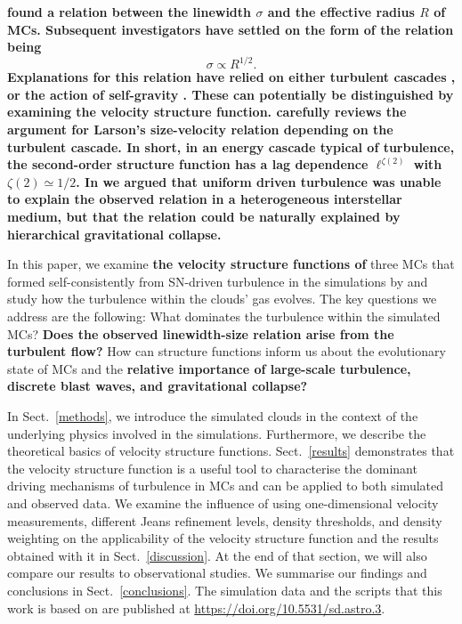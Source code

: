 \textbf{
\citet{Larson1981} found a relation between the linewidth $\sigma$ and the effective radius $R$ of MCs.
Subsequent investigators have settled on the form of the relation being \citep{Solomon1987,Falgarone2009,Heyer2009}
}
\begin{equation} \label{eq:larson}
    \sigma \propto R^{1/2}.
\end{equation}
\textbf{Explanations for this relation have relied on either turbulent cascades \citep{Larson1981,Kritsuk2013,Kritsuk2015,Gnedin2015,Padoan2016}, or the action of self-gravity \citep{Elmegreen1993,Vazquez2006,Elmegreen2007,Heyer2009,Ballesteros2011}.  These can potentially be distinguished by examining the velocity structure function.
\citet{Kritsuk2013} carefully reviews the argument for Larson's size-velocity relation depending on the turbulent cascade. In short, in an energy cascade typical of turbulence, the second-order structure function has a lag dependence $\ell^{\zeta(2)}$  with $\zeta(2) \simeq 1/2$. In \citet[hereafter ]{IbanezMejia2016} we argued that uniform driven turbulence was unable to explain the observed relation in a heterogeneous interstellar medium, but that the relation could be naturally explained by hierarchical gravitational collapse.}

In this paper, we examine \textbf{the velocity structure functions of} three MCs that formed self-consistently from SN-driven turbulence in the simulations by \citet[hereafter  and ]{IbanezMejia2016,IbanezMejia2017} and study how the turbulence within the clouds' gas evolves.
The key questions we address are the following:  What dominates the turbulence within the simulated MCs? \textbf{Does the observed linewidth-size relation arise from the turbulent flow?}
How can structure functions inform us about the evolutionary state of MCs and the \textbf{relative importance of large-scale turbulence, discrete blast waves, and gravitational collapse?}

In Sect.~\ref{methods}, we introduce the simulated clouds in the context of the underlying physics involved in the simulations.
Furthermore, we describe the theoretical basics of velocity structure functions.
Sect.~\ref{results} demonstrates that the velocity structure function is a useful tool to characterise the dominant driving mechanisms of turbulence in MCs and can be applied to both simulated and observed data. 
We examine the influence of using one-dimensional velocity measurements, different Jeans refinement levels, density thresholds, and density weighting on the applicability of the velocity structure function and the results obtained with it in Sect.~\ref{discussion}.  
At the end of that section, we will also compare our results to observational studies.
We summarise our findings and conclusions in Sect.~\ref{conclusions}.  The simulation data and the scripts that this work is based on are published 
at {\url{https://doi.org/10.5531/sd.astro.3}}.




\endinput
